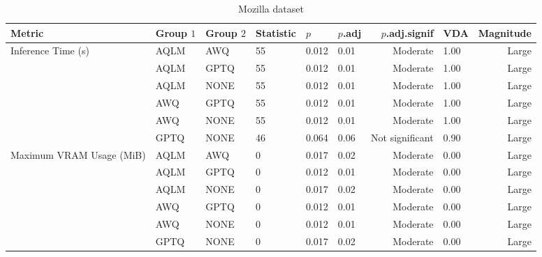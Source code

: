 \begin{table}[H]
\centering
\caption*{Mozilla dataset}
\begin{tabular}{llllllrlr}
\toprule
Metric & Group $1$ & Group $2$ & Statistic & $p$ & $p$.adj & $p$.adj.signif & VDA & Magnitude\\
\midrule
Inference Time (s) & AQLM & AWQ & 55 & 0.012 & 0.01 & Moderate & 1.00 & Large \\
\phantom & AQLM & GPTQ & 55 & 0.012 & 0.01 & Moderate & 1.00 & Large \\
\phantom & AQLM & NONE & 55 & 0.012 & 0.01 & Moderate & 1.00 & Large \\
\phantom & AWQ & GPTQ & 55 & 0.012 & 0.01 & Moderate & 1.00 & Large \\
\phantom & AWQ & NONE & 55 & 0.012 & 0.01 & Moderate & 1.00 & Large \\
\phantom & GPTQ & NONE & 46 & 0.064 & 0.06 & Not significant & 0.90 & Large \\
\midrule
Maximum VRAM Usage (MiB) & AQLM & AWQ & 0 & 0.017 & 0.02 & Moderate & 0.00 & Large \\
\phantom & AQLM & GPTQ & 0 & 0.012 & 0.01 & Moderate & 0.00 & Large \\
\phantom & AQLM & NONE & 0 & 0.017 & 0.02 & Moderate & 0.00 & Large \\
\phantom & AWQ & GPTQ & 0 & 0.012 & 0.01 & Moderate & 0.00 & Large \\
\phantom & AWQ & NONE & 0 & 0.012 & 0.01 & Moderate & 0.00 & Large \\
\phantom & GPTQ & NONE & 0 & 0.017 & 0.02 & Moderate & 0.00 & Large \\
\bottomrule
\end{tabular}
\label{tab:RQ2_posthoc_full}
\end{table}
